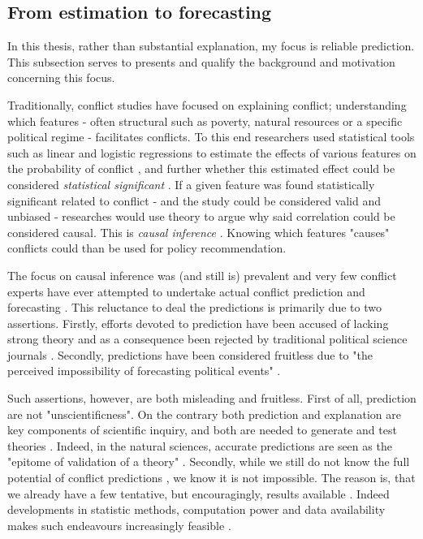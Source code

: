 \documentclass[a4paper]{article}
\begin{document}
\subsection{From estimation to forecasting}\label{est_to_pred} %

In this thesis, rather than substantial explanation, my focus is reliable prediction. This subsection serves to presents and qualify the background and motivation concerning this focus.\par

Traditionally, conflict studies have focused on explaining conflict; understanding which features - often structural such as poverty, natural resources or a specific political regime - facilitates conflicts. To this end researchers used statistical tools such as linear and logistic regressions to estimate the effects of various features on the probability of conflict \citep[8]{chadefaux2017conflict}, and further whether this estimated effect could be considered \emph{statistical significant} \citep[363-364]{Ward_Greenhill_Bakke_2010}. If a given feature was found statistically significant related to conflict - and the study could be considered valid and unbiased - researches would use theory to argue why said correlation could be considered causal. This is \emph{causal inference} \citep[8]{chadefaux2017conflict}. Knowing which features "causes" conflicts could than be used for policy recommendation.\par

The focus on causal inference was (and still is) prevalent and very few conflict experts have ever attempted to undertake actual conflict prediction and forecasting \citep[474]{cederman2017predicting}. This reluctance to deal the predictions is primarily due to two assertions. Firstly, efforts devoted to prediction have been accused of lacking strong theory and as a consequence been rejected by traditional political science journals \citep[8-9]{chadefaux2017conflict}. Secondly, predictions have been considered fruitless due to "the perceived impossibility of forecasting political events" \citep[8]{chadefaux2017conflict}.

Such assertions, however, are both misleading and fruitless. First of all, prediction are not "unscientificness". On the contrary both prediction and explanation are key components of scientific inquiry, and both are needed to generate and test theories \citep[8]{chadefaux2017conflict}. Indeed, in the natural sciences, accurate predictions are seen as the "epitome of validation of a theory" \citep[289]{Schrodt_2014}. Secondly, while we still do not know the full potential of conflict predictions \citep{cederman2017predicting, chadefaux2017conflict}, we know it is not impossible. The reason is, that we already have a few tentative, but encouragingly, results available \citep{Goldstone_2010, perry_2013, mueller_2016, Maase}. Indeed developments in statistic methods, computation power and data availability makes such endeavours increasingly feasible \citep{ol2010afghanistan, perry_2013}. 
\end{document}
